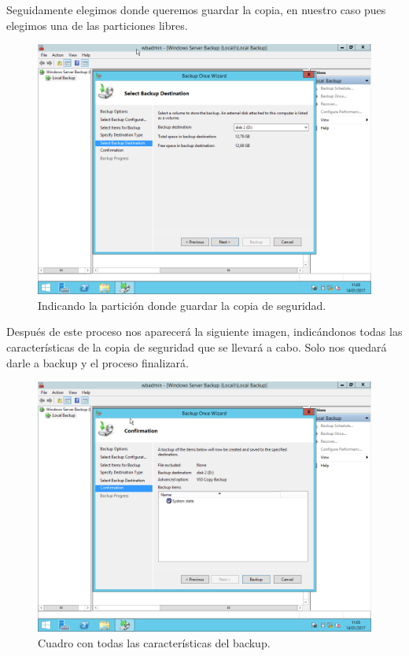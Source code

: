 \newpage
Seguidamente elegimos donde queremos guardar la copia, en nuestro caso pues elegimos una de las particiones libres.
\begin{figure}[H]
	\begin{center}
		\includegraphics[width=15cm]{Imagenes/Indicando_disk2.png}
		\caption{Indicando la partición donde guardar la copia de seguridad.}
		\label{fig:14}
	\end{center}
\end{figure}

\newpage
Después de este proceso nos aparecerá la siguiente imagen, indicándonos todas las características de la copia de seguridad que se llevará a cabo. Solo nos quedará darle a backup y el proceso finalizará.
\begin{figure}[H]
	\begin{center}
		\includegraphics[width=15cm]{Imagenes/Fin_1}
		\caption{Cuadro con todas las características del backup.}
		\label{fig:15}
	\end{center}
\end{figure}
\newpage

